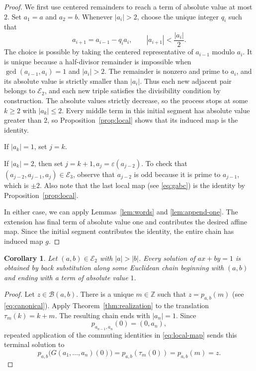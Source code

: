 \documentclass[12pt,letterpaper]{article}
\numberwithin{equation}{section}
\newcommand{\Z}{\mathbb Z}
\newcommand{\B}{\mathcal B}
\newcommand{\E}{\mathcal E}
\newcommand{\eps}{\varepsilon}
\theoremstyle{plain}
\newtheorem{corollary}[theorem]{Corollary}
\theoremstyle{definition}
\begin{document}
\begin{proof}
We first use centered remainders to reach a term of absolute value at most $2$. Set $a_1=a$ and $a_2=b$. Whenever $|a_i|>2$, choose the unique integer $q_i$ such that
\[
 a_{i+1}=a_{i-1}-q_i a_i,
 \qquad |a_{i+1}|<\frac{|a_i|}{2}.
\]
The choice is possible by taking the centered representative of $a_{i-1}$ modulo $a_i$. It is unique because a half-divisor remainder is impossible when $\gcd(a_{i-1},a_i)=1$ and $|a_i|>2$. The remainder is nonzero and prime to $a_i$, and its absolute value is strictly smaller than $|a_i|$. Thus each new adjacent pair belongs to $\E_2$, and each new triple satisfies the divisibility condition by construction. The absolute values strictly decrease, so the process stops at some $k\geq2$ with $|a_k|\leq2$. Every middle term in this initial segment has absolute value greater than $2$, so Proposition~\ref{prop:local} shows that its induced map is the identity.

If $|a_k|=1$, set $j=k$. 

If $|a_k|=2$, then set $j=k+1, a_j=\eps(a_{j-2})$. To check that $(a_{j-2},a_{j-1},a_j)\in\E_3$, observe that $a_{j-2}$ is odd because it is prime to $a_{j-1}$, which is $\pm2$. Also note that the last local map (see \eqref{eq:gabc}) is the identity by Proposition~\ref{prop:local}. 

In either case, we can apply Lemmas~\ref{lem:words} and \ref{lem:append-one}. The extension has final term of absolute value one and contributes the desired affine map. Since the initial segment contributes the identity, the entire chain has induced map $g$.
\end{proof}

\begin{corollary}
Let $(a,b)\in\E_2$ with $|a|>|b|$. Every solution of $ax+by=1$ is obtained by back substitution along some Euclidean chain beginning with $(a,b)$ and ending with a term of absolute value $1$.
\end{corollary}

\begin{proof}
Let $z\in\B(a,b)$. There is a unique $m\in\Z$ such that $z=p_{a,b}(m)$ (see \eqref{eq:canonical}). Apply Theorem~\ref{thm:realization} to the translation $\tau_m(k)=k+m$. The resulting chain ends with $|a_n|=1$. Since
\[
 p_{a_{n-1},a_n}(0)=(0,a_n),
\]
repeated application of the commuting identities in \eqref{eq:local-map} sends this terminal solution to
\[
 p_{a,b}\bigl(G(a_1,\ldots,a_n)(0)\bigr)
 =p_{a,b}(\tau_m(0))
 =p_{a,b}(m)=z.
\]
\end{proof}
\end{document}
